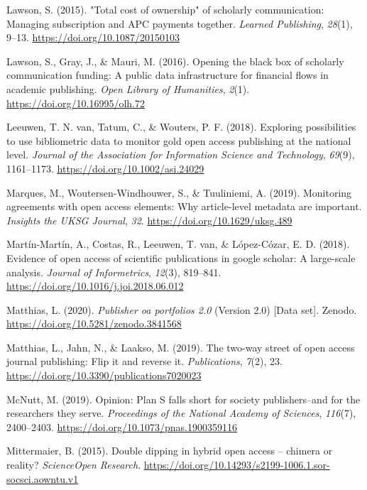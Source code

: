 \documentclass[a4paper,man,floatsintext,longtable,noextraspace,12pt]{apa6}
\newlength{\cslhangindent}
\newenvironment{cslreferences}%
  {\setlength{\parindent}{0pt}%
  \everypar{\setlength{\hangindent}{\cslhangindent}}\ignorespaces}%
  {\par}
\begin{document}
\begin{cslreferences}
\leavevmode\hypertarget{ref-Lawson_2015}{}%
Lawson, S. (2015). "Total cost of ownership" of scholarly communication:
Managing subscription and APC payments together. \emph{Learned
Publishing}, \emph{28}(1), 9--13. \url{https://doi.org/10.1087/20150103}

\leavevmode\hypertarget{ref-Lawson_2016}{}%
Lawson, S., Gray, J., \& Mauri, M. (2016). Opening the black box of
scholarly communication funding: A public data infrastructure for
financial flows in academic publishing. \emph{Open Library of
Humanities}, \emph{2}(1). \url{https://doi.org/10.16995/olh.72}

\leavevmode\hypertarget{ref-van_Leeuwen_2018}{}%
Leeuwen, T. N. van, Tatum, C., \& Wouters, P. F. (2018). Exploring
possibilities to use bibliometric data to monitor gold open access
publishing at the national level. \emph{Journal of the Association for
Information Science and Technology}, \emph{69}(9), 1161--1173.
\url{https://doi.org/10.1002/asi.24029}

\leavevmode\hypertarget{ref-Marques_2019}{}%
Marques, M., Woutersen-Windhouwer, S., \& Tuuliniemi, A. (2019).
Monitoring agreements with open access elements: Why article-level
metadata are important. \emph{Insights the UKSG Journal}, \emph{32}.
\url{https://doi.org/10.1629/uksg.489}

\leavevmode\hypertarget{ref-Mart_n_Mart_n_2018}{}%
Martín-Martín, A., Costas, R., Leeuwen, T. van, \& López-Cózar, E. D.
(2018). Evidence of open access of scientific publications in google
scholar: A large-scale analysis. \emph{Journal of Informetrics},
\emph{12}(3), 819--841. \url{https://doi.org/10.1016/j.joi.2018.06.012}

\leavevmode\hypertarget{ref-Matthias_2020}{}%
Matthias, L. (2020). \emph{Publisher oa portfolios 2.0} (Version 2.0)
{[}Data set{]}. Zenodo. \url{https://doi.org/10.5281/zenodo.3841568}

\leavevmode\hypertarget{ref-Matthias_2019}{}%
Matthias, L., Jahn, N., \& Laakso, M. (2019). The two-way street of open
access journal publishing: Flip it and reverse it. \emph{Publications},
\emph{7}(2), 23. \url{https://doi.org/10.3390/publications7020023}

\leavevmode\hypertarget{ref-McNutt_2019}{}%
McNutt, M. (2019). Opinion: Plan S falls short for society
publishers--and for the researchers they serve. \emph{Proceedings of the
National Academy of Sciences}, \emph{116}(7), 2400--2403.
\url{https://doi.org/10.1073/pnas.1900359116}

\leavevmode\hypertarget{ref-Mittermaier_2015}{}%
Mittermaier, B. (2015). Double dipping in hybrid open access -- chimera
or reality? \emph{ScienceOpen Research}.
\url{https://doi.org/10.14293/s2199-1006.1.sor-socsci.aowntu.v1}


\end{cslreferences}
\end{document}
